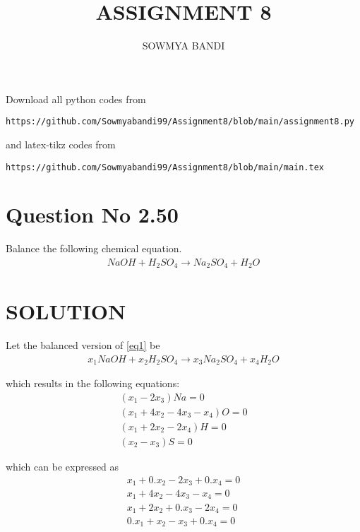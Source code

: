 \documentclass[journal,12pt,twocolumn]{IEEEtran}
\begin{document}
     \def\rightbox#1{\makebox[0in][r]{#1}}
     \def\centbox#1{\makebox[0in]{#1}}
     \def\topbox#1{\raisebox{-\baselineskip}[0in][0in]{#1}}
     \def\midbox#1{\raisebox{-0.5\baselineskip}[0in][0in]{#1}}
\vspace{3cm}
\title{ASSIGNMENT 8}
\author{SOWMYA BANDI}
\maketitle
\newpage
\bigskip
\renewcommand{\thefigure}{\theenumi}
\renewcommand{\thetable}{\theenumi}
Download all python codes from 
%
\begin{lstlisting}
https://github.com/Sowmyabandi99/Assignment8/blob/main/assignment8.py
\end{lstlisting}
%
and latex-tikz codes from 
%
\begin{lstlisting}
https://github.com/Sowmyabandi99/Assignment8/blob/main/main.tex
\end{lstlisting}
%
\section{Question No 2.50}
Balance the following chemical equation.
\begin{align}
NaOH + H_2SO_4 \xrightarrow{} Na_2SO_4 + H_2O \label{eq1}
\end{align}
%
\section{SOLUTION} 
Let the balanced version of \eqref{eq1} be
\begin{align}
   x_{1}NaOH + x_{2}H_2SO_4 \xrightarrow{} 
   x_{3}Na_2SO_4 + x_{4}H_2O \label{eq2}
\end{align}

which results in the following equations:
\begin{align}
    (x_{1}-2x_{3}) Na= 0\\
    (x_{1}+4x_{2}-4x_{3}-x_{4}) O= 0\\
    (x_{1}+2x_{2}-2x_{4}) H=0\\
    (x_{2}-x_{3}) S= 0
\end{align}

which can be expressed as
\begin{align}
    x_{1}+ 0.x_{2}- 2x_{3}+ 0.x_{4} = 0\\
    x_{1}+ 4x_{2}- 4x_{3}- x_{4} = 0\\
    x_{1}+ 2x_{2}+ 0.x_{3}- 2x_{4} = 0\\
    0.x_{1}+ x_{2}- x_{3}+ 0.x_{4} = 0
\end{align}
\end{document}
